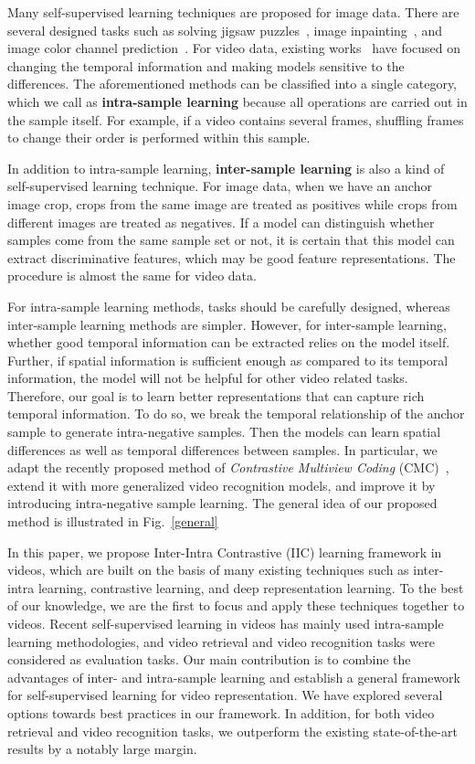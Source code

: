 \documentclass[sigconf]{acmart}
\begin{document}
Many self-supervised learning techniques are proposed for image data. There are several designed tasks such as solving jigsaw puzzles~\cite{noroozi2016unsupervised}, image inpainting~\cite{pathak2016context}, and image color channel prediction~\cite{zhang2016colorful}. For video data, existing works~\cite{misra2016shuffle,fernando2017self,lee2017unsupervised,xu2019self} have focused on changing the temporal information and making models sensitive to the differences. The aforementioned methods can be classified into a single category, which we call as \textbf{intra-sample learning} because all operations are carried out in the sample itself. For example, if a video contains several frames, shuffling frames to change their order is performed within this sample.

In addition to intra-sample learning, \textbf{inter-sample learning} is also a kind of self-supervised learning technique. For image data, when we have an anchor image crop, crops from the same image are treated as positives while crops from different images are treated as negatives. If a model can distinguish whether samples come from the same sample set or not, it is certain that this model can extract discriminative features, which may be good feature representations. The procedure is almost the same for video data.

For intra-sample learning methods, tasks should be carefully designed, whereas inter-sample learning methods are simpler. However, for inter-sample learning, whether good temporal information can be extracted relies on the model itself. Further, if spatial information is sufficient enough as compared to its temporal information, the model will not be helpful for other video related tasks. Therefore, our goal is to learn better representations that can capture rich temporal information. To do so, we break the temporal relationship of the anchor sample to generate intra-negative samples. Then the models can learn spatial differences as well as temporal differences between samples. In particular, we adapt the recently proposed method of \textit{Contrastive Multiview Coding} (CMC)~\cite{tian2019contrastive}, extend it with more generalized video recognition models, and improve it by introducing intra-negative sample learning. The general idea of our proposed method is illustrated in Fig.~\ref{general}

In this paper, we propose Inter-Intra Contrastive (IIC) learning framework in videos, which are built on the basis of many existing techniques such as inter-intra learning, contrastive learning, and deep representation learning. To the best of our knowledge, we are the first to focus and apply these techniques together to videos. Recent self-supervised learning in videos has mainly used intra-sample learning methodologies, and video retrieval and video recognition tasks were considered as evaluation tasks. Our main contribution is to combine the advantages of inter- and intra-sample learning and establish a general framework for self-supervised learning for video representation. We have explored several options towards best practices in our framework. In addition, for both video retrieval and video recognition tasks, we outperform the existing state-of-the-art results by a notably large margin. 
\end{document}
